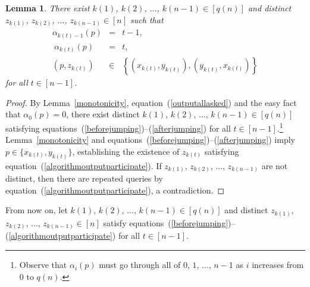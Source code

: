 \documentclass[letterpaper,12pt]{article}
\newtheorem{lemma}[theorem]{Lemma}
\begin{document}
\begin{lemma}\label{identifyingjumps}
There exist
$k(1)$, $k(2)$, $\ldots$, $k(n-1)\in [q(n)]$
and distinct $z_{k(1)}$, $z_{k(2)}$, $\ldots$, $z_{k(n-1)}\in[n]$
such that
\begin{eqnarray}
\alpha_{k(t)-1}(p)&=&t-1,\label{beforejumping}\\\
\alpha_{k(t)}(p)&=&t,\label{afterjumping}\\
\left(p,z_{k(t)}\right)
&\in&\left\{\left(x_{k(t)}, y_{k(t)}\right), \left(y_{k(t)}, x_{k(t)}\right)
\right\}
\label{algorithmoutputparticipate}
\end{eqnarray}
for all $t\in[n-1]$.
\end{lemma}
\begin{proof}
By
Lemma~\ref{monotonicity}, equation~(\ref{outputallasked}) and the easy fact
that $\alpha_0(p)=0$,
there exist distinct $k(1)$, $k(2)$, $\ldots$, $k(n-1)\in [q(n)]$ satisfying
equations~(\ref{beforejumping})--(\ref{afterjumping})
for all $t\in[n-1]$.\footnote{Observe that
$\alpha_i(p)$ must go through all of $0$, $1$, $\ldots$, $n-1$ as $i$
increases from $0$ to $q(n)$.}
Lemma~\ref{monotonicity} and
equations~(\ref{beforejumping})--(\ref{afterjumping}) imply
$p\in\{x_{k(t)}, y_{k(t)}\}$, establishing the existence of
$z_{k(t)}$ satisfying
equation~(\ref{algorithmoutputparticipate}).
If $z_{k(1)}$, $z_{k(2)}$, $\ldots$, $z_{k(n-1)}$ are not distinct, then
there are repeated queries by
equation~(\ref{algorithmoutputparticipate}), a contradiction.
\end{proof}

From now on, let
$k(1)$, $k(2)$, $\ldots$, $k(n-1)\in [q(n)]$
and distinct $z_{k(1)}$, $z_{k(2)}$, $\ldots$, $z_{k(n-1)}\in[n]$
satisfy
equations~(\ref{beforejumping})--(\ref{algorithmoutputparticipate})
for all $t\in[n-1]$.
\end{document}
